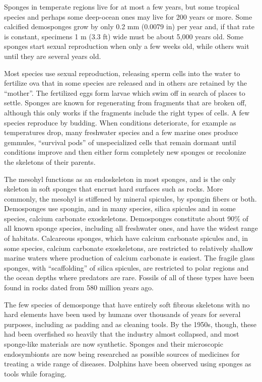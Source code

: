 \documentclass[]{book}
\theoremstyle{definition}
\theoremstyle{definition}
\theoremstyle{definition}
\theoremstyle{remark}
\begin{document}
Sponges in temperate regions live for at most a few years, but some
tropical species and perhaps some deep-ocean ones may live for 200 years
or more. Some calcified demosponges grow by only 0.2 mm (0.0079 in) per
year and, if that rate is constant, specimens 1 m (3.3 ft) wide must be
about 5,000 years old. Some sponges start sexual reproduction when only
a few weeks old, while others wait until they are several years old.

Most species use sexual reproduction, releasing sperm cells into the
water to fertilize ova that in some species are released and in others
are retained by the ``mother''. The fertilized eggs form larvae which
swim off in search of places to settle. Sponges are known for
regenerating from fragments that are broken off, although this only
works if the fragments include the right types of cells. A few species
reproduce by budding. When conditions deteriorate, for example as
temperatures drop, many freshwater species and a few marine ones produce
gemmules, ``survival pods'' of unspecialized cells that remain dormant
until conditions improve and then either form completely new sponges or
recolonize the skeletons of their parents.

The mesohyl functions as an endoskeleton in most sponges, and is the
only skeleton in soft sponges that encrust hard surfaces such as rocks.
More commonly, the mesohyl is stiffened by mineral spicules, by spongin
fibers or both. Demosponges use spongin, and in many species, silica
spicules and in some species, calcium carbonate exoskeletons.
Demosponges constitute about 90\% of all known sponge species, including
all freshwater ones, and have the widest range of habitats. Calcareous
sponges, which have calcium carbonate spicules and, in some species,
calcium carbonate exoskeletons, are restricted to relatively shallow
marine waters where production of calcium carbonate is easiest. The
fragile glass sponges, with ``scaffolding'' of silica spicules, are
restricted to polar regions and the ocean depths where predators are
rare. Fossils of all of these types have been found in rocks dated from
580 million years ago.

The few species of demosponge that have entirely soft fibrous skeletons
with no hard elements have been used by humans over thousands of years
for several purposes, including as padding and as cleaning tools. By the
1950s, though, these had been overfished so heavily that the industry
almost collapsed, and most sponge-like materials are now synthetic.
Sponges and their microscopic endosymbionts are now being researched as
possible sources of medicines for treating a wide range of diseases.
Dolphins have been observed using sponges as tools while foraging.
\end{document}
